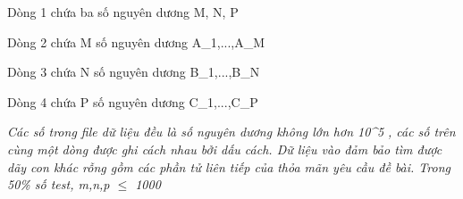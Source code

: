 Dòng 1 chứa ba số nguyên dương M, N, P

Dòng 2 chứa M số nguyên dương A\_1,...,A\_M

Dòng 3 chứa N số nguyên dương B\_1,...,B\_N

Dòng 4 chứa P số nguyên dương C\_1,...,C\_P

\emph{Các số trong file dữ liệu đều là số nguyên dương không lớn hơn 10^5 }\emph{ , các số trên cùng một dòng được ghi cách nhau bởi dấu cách. Dữ liệu vào đảm bảo tìm được dãy con khác rỗng gồm các phần tử liên tiếp của }\emph{ thỏa mãn yêu cầu đề bài. Trong 50\% số test, m,n,p  $\le$  1000 }